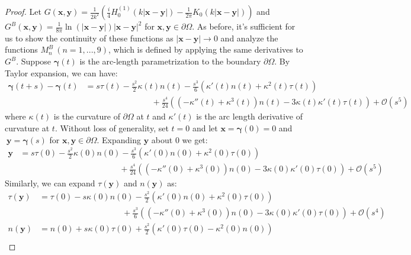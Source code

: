 \documentclass[preprint,12pt,3p]{elsarticle}
\begin{document}
\begin{proof}
     Let $G(\mathbf{x},\mathbf{y}) =  \frac{1}{2k^2} (\frac{i}{4} H_0^{(1)} (k |\mathbf{x} - \mathbf{y}|) - \frac{1}{2\pi} K_0 (k | \mathbf{x} - \mathbf{y}|)) $ 
     and $G^{B}(\mathbf{x},\mathbf{y}) = \frac{1}{8\pi}\ln(|\mathbf{x}-\mathbf{y}|)|\mathbf{x}-\mathbf{y}|^2$ for $\mathbf{x}, \mathbf{y} \in \partial \Omega$. As before, it's sufficient for us to show the continuity of these functions as $|\mathbf{x}-\mathbf{y}| \to 0$ and analyze the functions $M^{B}_{n} \ (n = 1,...,9)$, which is defined by applying the same derivatives to $G^{B}$. Suppose $\pmb{\gamma}(t)$ is the arc-length parametrization to the boundary $\partial \Omega$. By Taylor expansion, we can have: 
     \begin{align}
          \pmb{\gamma}(t + s) - \pmb{\gamma}(t) &= s \tau(t) - \frac{s^2}{2} \kappa(t) n(t)  - \frac{s^3}{6}(\kappa'(t) n(t) + \kappa^2(t) \tau(t)) \nonumber\\
          &\qquad\qquad\qquad\qquad + \frac{s^4}{24}((- \kappa''(t) + \kappa^3(t)) n(t) - 3\kappa(t) \kappa'(t) \tau(t) ) + \mathcal{O}(s^5)  \label{gammaseries}
     \end{align}
    where $\kappa(t)$ is the curvature of $\partial \Omega$ at $t$ and $\kappa'(t)$ is the arc length derivative of curvature at $t$. Without loss of generality, set $t = 0$ and let $\mathbf{x} = \pmb{\gamma}(0) = 0$ and $ \ \mathbf{y} = \pmb{\gamma}(s) $ for $\mathbf{x}, \mathbf{y}\in \partial \Omega$. Expanding $\mathbf{y}$ about 0 we get:
     \begin{align}
          \mathbf{y} &= s\tau(0) - \frac{s^2}{2} \kappa(0) n(0)  - \frac{s^3}{6}(\kappa'(0) n(0) + \kappa^2(0) \tau(0)) \nonumber \\
          &\qquad \qquad\qquad\qquad\qquad\qquad + \frac{s^4}{24}((- \kappa''(0) + \kappa^3(0)) n(0) - 3\kappa(0) \kappa'(0) \tau(0) ) + \mathcal{O}(s^5) \label{yseries}
     \end{align}
    Similarly, we can expand $ \tau(\mathbf{y}) $ and $ n(\mathbf{y}) $ as: 
    \begin{align}
         \tau(\mathbf{y})  &= \tau(0) - s \kappa(0) n(0) -\frac{s^2}{2}(\kappa'(0) n(0) + \kappa^2(0) \tau(0)) \nonumber \\
         &\qquad\qquad\qquad\qquad\qquad  +\frac{s^3}{6}((- \kappa''(0) + \kappa^3(0)) n(0) - 3\kappa(0) \kappa'(0) \tau(0) ) + \mathcal{O}(s^4) \label{tauseries}\\
         n(\mathbf{y})  &= n(0) + s \kappa(0) \tau(0)   + \frac{s^2}{2}(\kappa'(0) \tau(0) - \kappa^2(0) n(0)) \nonumber \\

\end{align}
\end{proof}
\end{document}
